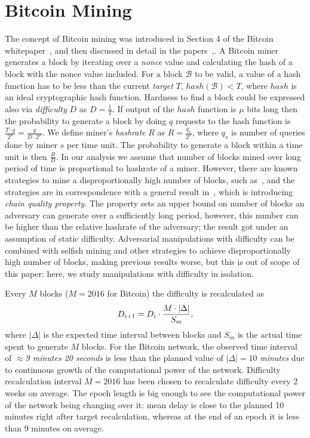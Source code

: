 \documentclass[]{llncs}
\newcommand{\texp}{|\Delta|}
\newcommand{\block}{\mathcal{B}}
\begin{document}
\section{Bitcoin Mining}
\label{sec:bit}

The concept of Bitcoin mining was introduced in Section 4 of the Bitcoin whitepaper~\cite{Nakamoto2008}, and then discussed in detail in the papers~\cite{kraft2015difficulty},\cite{gkl16}. A Bitcoin miner generates a block by iterating over a {\em nonce} value and calculating the hash of a block with the nonce value included. For a block $\block$ to be valid, a value of a hash function has to be less than the current {\em target} $T$, $hash(\block) < T$, where $hash$ is an ideal cryptographic hash function. Hardness to find a block could be expressed also via {\em difficulty} $D$ as $D = \frac{1}{T}$. If output of the $hash$ function is $\mu$ bits long then the probability to generate a block by doing $q$ requests to the hash function is $\frac{T \cdot q}{2^\mu} = \frac{q}{D \cdot 2^\mu}$. We define miner's {\em hashrate} $R$ as $R = \frac{q_s}{2^\mu}$, where $q_s$ is number of queries done by miner $s$ per time unit. The probability to generate a block within a time unit is then $\frac{R}{D}$. In our analysis we assume that number of blocks mined over  long period of time is proportional to hashrate of a miner. However, there are known strategies to mine a disproportionally high number of blocks, such as~\cite{eyal2014majority}, and the strategies are in correspondence with a general result in~\cite{garay2015bitcoin}, which is introducing {\em chain quality property}. The property sets an upper bound on number of blocks an adversary can generate over a sufficiently long period, however, this number can be higher than the relative hashrate of the adversary; the result got under an assumption of static difficulty. Adversarial manipulations with difficulty can be combined with selfish mining and other strategies to achieve disproportionally high number of blocks, making previous results worse, but this is out of scope of this paper: here, we study manipulations with difficulty in isolation. 


Every $M$ blocks ($M = 2016$ for Bitcoin) the difficulty is recalculated as
$$
D_{i+1}=D_i \cdot {M \cdot \texp \over S_m},
$$
where $\texp$ is the expected time interval between blocks and $S_m$ is the actual time spent to generate $M$ blocks.
For the Bitcoin network, the observed time interval of $\approx${\em 9 minutes 20 seconds} is less than the planned value of $\texp = 10$ {\em minutes} due to continuous growth of the computational power of the network.
Difficulty recalculation interval $M=2016$ has been chosen to recalculate difficulty every 2 weeks on average.
The epoch length is big enough to see the computational power of the network being changing over it: mean delay is close to the planned 10 minutes right after target recalculation, whereas at the end of an epoch it is less than 9 minutes on average.
\end{document}
